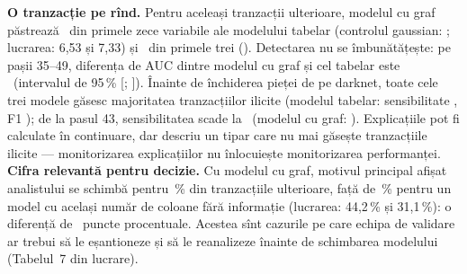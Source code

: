 %
{\textbf{O tranzacție pe rînd.} Pentru aceleași tranzacții ulterioare, modelul cu graf păstrează \NtopGT\ din primele zece variabile ale modelului tabelar (controlul gaussian: \NtopCT; lucrarea: 6,53 și 7,33) și \NtopThreeG\ din primele trei (\NtopThreeC). Detectarea nu se îmbunătățește: pe pașii 35--49, diferența de AUC dintre modelul cu graf și cel tabelar este \NaucDiff\ (intervalul de 95\,\% [\NaucDiffLo; \NaucDiffHi]).
Înainte de închiderea pieței de pe darknet, toate cele trei modele găsesc majoritatea tranzacțiilor ilicite (modelul tabelar: sensibilitate \NrecBpre, F1 \NfBpre); de la pasul 43, sensibilitatea scade la \NrecBpost\ (modelul cu graf: \NrecGpost). Explicațiile pot fi calculate în continuare, dar descriu un tipar care nu mai găsește tranzacțiile ilicite --- monitorizarea explicațiilor nu înlocuiește monitorizarea performanței.
\textbf{Cifra relevantă pentru decizie.} Cu modelul cu graf, motivul principal afișat analistului se schimbă pentru \NleadG\,\% din tranzacțiile ulterioare, față de \NleadC\,\% pentru un model cu același număr de coloane fără informație (lucrarea: 44,2\,\% și 31,1\,\%): o diferență de \NleadGap\ puncte procentuale. Acestea sînt cazurile pe care echipa de validare ar trebui să le eșantioneze și să le reanalizeze înainte de schimbarea modelului (Tabelul~7 din lucrare).}

